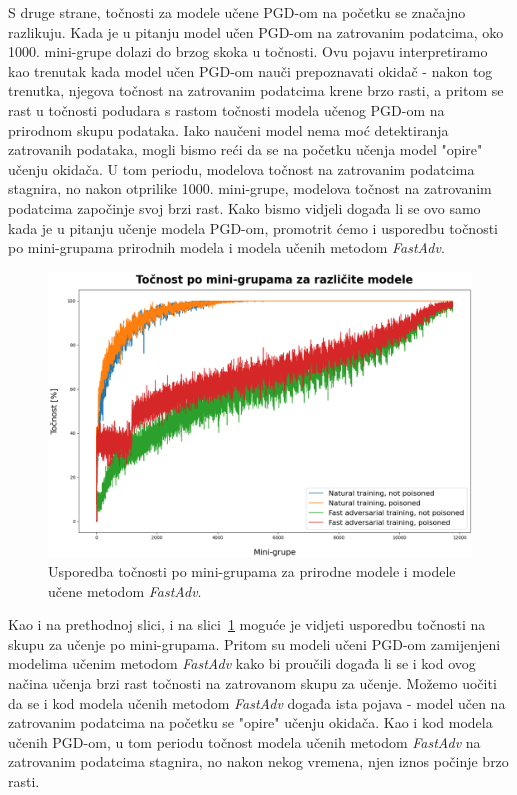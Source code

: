 \documentclass[times, utf8, zavrsni, numeric]{fer}
\begin{document}
S druge strane, točnosti za modele učene PGD-om na početku se značajno razlikuju. 
Kada je u pitanju model učen PGD-om na zatrovanim podatcima, oko 1000. mini-grupe dolazi do brzog skoka u točnosti.
Ovu pojavu interpretiramo kao trenutak kada model učen PGD-om nauči prepoznavati okidač - nakon tog trenutka, njegova točnost na zatrovanim podatcima krene brzo rasti, 
a pritom se rast u točnosti podudara s rastom točnosti modela učenog PGD-om na prirodnom skupu podataka.
Iako naučeni model nema moć detektiranja zatrovanih podataka, mogli bismo reći da se na početku učenja model "opire" učenju okidača.
U tom periodu, modelova točnost na zatrovanim podatcima stagnira, no nakon otprilike 1000. mini-grupe, modelova točnost na zatrovanim podatcima započinje svoj brzi rast. 
Kako bismo vidjeli događa li se ovo samo kada je u pitanju učenje modela PGD-om, promotrit ćemo i usporedbu točnosti po mini-grupama prirodnih modela i modela učenih metodom \textit{FastAdv}.

\pagebreak

\begin{figure}[htb]
    \centering
    \includegraphics[scale=0.4]{../stats/train_accuracy_comparison_nat_fast.png}
    \caption{Usporedba točnosti po mini-grupama za prirodne modele i modele učene metodom \textit{FastAdv}.}
    \label{fig:fast_nat_poisoned_comparison}
\end{figure}

Kao i na prethodnoj slici, i na slici~\ref{fig:fast_nat_poisoned_comparison} moguće je vidjeti usporedbu točnosti na skupu za učenje po mini-grupama.
Pritom su modeli učeni PGD-om zamijenjeni modelima učenim metodom \textit{FastAdv} kako bi proučili događa li se i kod ovog načina učenja brzi rast točnosti na zatrovanom skupu za učenje.
Možemo uočiti da se i kod modela učenih metodom \textit{FastAdv} događa ista pojava - model učen na zatrovanim podatcima na početku se "opire" učenju okidača.
Kao i kod modela učenih PGD-om, u tom periodu točnost modela učenih metodom \textit{FastAdv} na zatrovanim podatcima stagnira, no nakon nekog vremena, njen iznos počinje brzo rasti.
\end{document}
